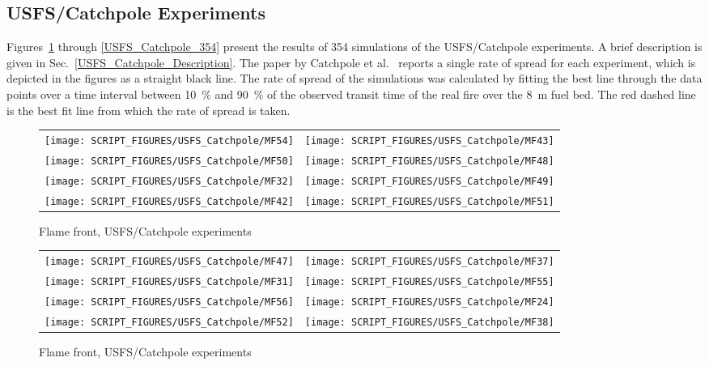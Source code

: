 \clearpage


\subsection{USFS/Catchpole Experiments}
\label{USFS_Catchpole_Plots}

Figures~\ref{USFS_Catchpole_008} through \ref{USFS_Catchpole_354} present the results of 354 simulations of the USFS/Catchpole experiments. A brief description is given in Sec.~\ref{USFS_Catchpole_Description}. The paper by Catchpole et al.~\cite{Catchpole:CST1998} reports a single rate of spread for each experiment, which is depicted in the figures as a straight black line. The rate of spread of the simulations was calculated by fitting the best line through the data points over a time interval between 10~\% and 90~\% of the observed transit time of the real fire over the 8~m fuel bed. The red dashed line is the best fit line from which the rate of spread is taken.

\newpage

\begin{figure}[p]
\begin{tabular*}{\textwidth}{l@{\extracolsep{\fill}}r}
\texttt{[image: SCRIPT\_FIGURES/USFS\_Catchpole/MF54]} &
\texttt{[image: SCRIPT\_FIGURES/USFS\_Catchpole/MF43]} \\
\texttt{[image: SCRIPT\_FIGURES/USFS\_Catchpole/MF50]} &
\texttt{[image: SCRIPT\_FIGURES/USFS\_Catchpole/MF48]} \\
\texttt{[image: SCRIPT\_FIGURES/USFS\_Catchpole/MF32]} &
\texttt{[image: SCRIPT\_FIGURES/USFS\_Catchpole/MF49]} \\
\texttt{[image: SCRIPT\_FIGURES/USFS\_Catchpole/MF42]} &
\texttt{[image: SCRIPT\_FIGURES/USFS\_Catchpole/MF51]} \\
\end{tabular*}
\caption[Flame front, USFS/Catchpole experiments]{Flame front, USFS/Catchpole experiments}
\label{USFS_Catchpole_008}
\end{figure}

\begin{figure}[p]
\begin{tabular*}{\textwidth}{l@{\extracolsep{\fill}}r}
\texttt{[image: SCRIPT\_FIGURES/USFS\_Catchpole/MF47]} &
\texttt{[image: SCRIPT\_FIGURES/USFS\_Catchpole/MF37]} \\
\texttt{[image: SCRIPT\_FIGURES/USFS\_Catchpole/MF31]} &
\texttt{[image: SCRIPT\_FIGURES/USFS\_Catchpole/MF55]} \\
\texttt{[image: SCRIPT\_FIGURES/USFS\_Catchpole/MF56]} &
\texttt{[image: SCRIPT\_FIGURES/USFS\_Catchpole/MF24]} \\
\texttt{[image: SCRIPT\_FIGURES/USFS\_Catchpole/MF52]} &
\texttt{[image: SCRIPT\_FIGURES/USFS\_Catchpole/MF38]} \\
\end{tabular*}
\caption[Flame front, USFS/Catchpole experiments]{Flame front, USFS/Catchpole experiments}
\label{USFS_Catchpole_016}
\end{figure}

